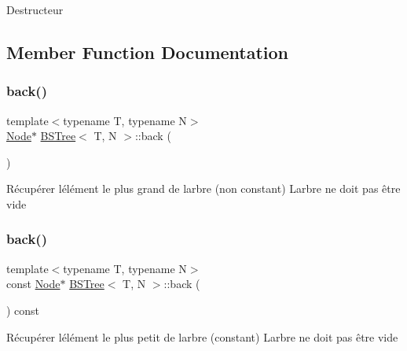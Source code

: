Destructeur 

\subsection{Member Function Documentation}
\mbox{\label{classBSTree_ae157e3cd6ea405927b214c51578cd999}} 
\subsubsection{\texorpdfstring{back()}{back()}\hspace{0.1cm}{\footnotesize\ttfamily [1/2]}}
{\footnotesize\ttfamily template$<$typename T, typename N$>$ \\
\hyperlink{classBSTree_a9c1a06548b3ff425e1d906f17ce2c858}{Node}$\ast$ \hyperlink{classBSTree}{B\+S\+Tree}$<$ T, N $>$\+::back (\begin{DoxyParamCaption}{ }\end{DoxyParamCaption})\hspace{0.3cm}{\ttfamily [inline]}}

Récupérer l\textquotesingle{}élément le plus grand de l\textquotesingle{}arbre (non constant) L\textquotesingle{}arbre ne doit pas être vide \mbox{\label{classBSTree_a4089d2fe1ca3ebe90ac7e951dbb50430}} 
\subsubsection{\texorpdfstring{back()}{back()}\hspace{0.1cm}{\footnotesize\ttfamily [2/2]}}
{\footnotesize\ttfamily template$<$typename T, typename N$>$ \\
const \hyperlink{classBSTree_a9c1a06548b3ff425e1d906f17ce2c858}{Node}$\ast$ \hyperlink{classBSTree}{B\+S\+Tree}$<$ T, N $>$\+::back (\begin{DoxyParamCaption}{ }\end{DoxyParamCaption}) const\hspace{0.3cm}{\ttfamily [inline]}}

Récupérer l\textquotesingle{}élément le plus petit de l\textquotesingle{}arbre (constant) L\textquotesingle{}arbre ne doit pas être vide \mbox{\label{classBSTree_a092be8c378a3f8f5acbd9dfec52d2e87}} 
